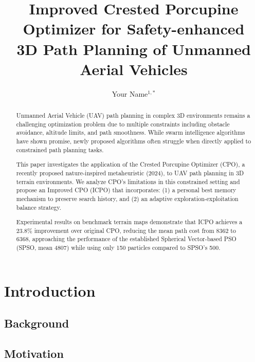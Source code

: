 \documentclass[12pt,a4paper]{article}
\title{Improved Crested Porcupine Optimizer for Safety-enhanced \\
       3D Path Planning of Unmanned Aerial Vehicles}
\author{Your Name$^{1,*}$}
\date{}
\begin{document}
\maketitle

\begin{abstract}
Unmanned Aerial Vehicle (UAV) path planning in complex 3D environments 
remains a challenging optimization problem due to multiple constraints 
including obstacle avoidance, altitude limits, and path smoothness. 
While swarm intelligence algorithms have shown promise, newly proposed 
algorithms often struggle when directly applied to constrained 
path planning tasks. 

This paper investigates the application of the Crested Porcupine 
Optimizer (CPO), a recently proposed nature-inspired metaheuristic 
(2024), to UAV path planning in 3D terrain environments. 
We analyze CPO's limitations in this constrained setting and propose 
an Improved CPO (ICPO) that incorporates:
(1) a personal best memory mechanism to preserve search history, and
(2) an adaptive exploration-exploitation balance strategy.

Experimental results on benchmark terrain maps demonstrate that 
ICPO achieves a 23.8\% improvement over original CPO, reducing the 
mean path cost from 8362 to 6368, approaching the performance of the 
established Spherical Vector-based PSO (SPSO, mean 4807) while using 
only 150 particles compared to SPSO's 500.
\end{abstract}

\section{Introduction}

\subsection{Background}

\subsection{Motivation}
\end{document}
